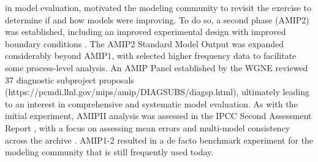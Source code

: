 \documentclass[gmd, preprint]{copernicus}
\begin{document}
in model evaluation, motivated the modeling community to revisit the exercise to determine if and how models were improving. To do so, a second phase (AMIP2) was established, including an improved experimental design with improved boundary conditions \citep{liang_pcmdi_1997, taylor_pcmdi_2000}. The AMIP2 Standard Model Output was expanded considerably beyond AMIP1, with selected higher frequency data to facilitate some process-level analysis. An AMIP Panel established by the WGNE reviewed 37 diagnostic subproject proposals (https://pcmdi.llnl.gov/mips/amip/DIAGSUBS/diagsp.html), ultimately leading to an interest in comprehensive and systematic model evaluation. As with the initial experiment, AMIPII analysis was assessed in the IPCC Second Assessment Report \citep[SAR;][]{gates_climate_1996}, with a focus on assessing mean errors and multi-model consistency across the archive \citep{gates_amip_1995}.  AMIP1-2 resulted in a de facto benchmark experiment for the modeling community that is still frequently used today.  
\end{document}
